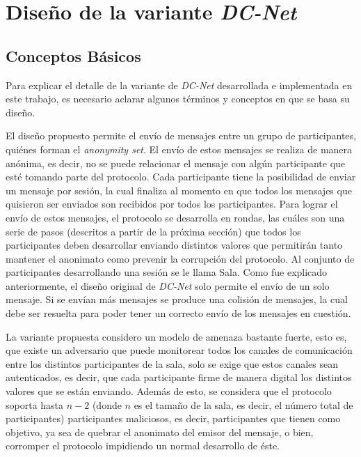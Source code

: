 \chapter{Diseño de la variante \emph{DC-Net}}\label{cap3}

\section{Conceptos Básicos}

Para explicar el detalle de la variante de \emph{DC-Net} desarrollada e implementada en este trabajo, es necesario aclarar algunos términos y conceptos en que se basa su diseño.

El diseño propuesto permite el envío de mensajes entre un grupo de participantes, quiénes forman el \emph{anonymity set}. El envío de estos mensajes se realiza de manera anónima, es decir, no se puede relacionar el mensaje con algún participante que esté tomando parte del protocolo. Cada participante tiene la posibilidad de enviar un mensaje por sesión, la cual finaliza al momento en que todos los mensajes que quisieron ser enviados son recibidos por todos los participantes. Para lograr el envío de estos mensajes, el protocolo se desarrolla en rondas, las cuáles son una serie de pasos 
(descritos a partir de la próxima sección) que todos los participantes deben desarrollar enviando distintos valores que permitirán tanto mantener el anonimato como prevenir la corrupción del protocolo. Al conjunto de participantes desarrollando una sesión se le llama Sala. Como fue explicado anteriormente, el diseño original de \emph{DC-Net} solo permite el envío de un solo mensaje. Si se envían más mensajes se produce una colisión de mensajes, la cual debe ser resuelta para poder tener un correcto envío de los mensajes en cuestión.

La variante propuesta considero un modelo de amenaza bastante fuerte, esto es, que existe un adversario que puede monitorear todos los canales de comunicación entre los distintos participantes de la sala, solo se exige que estos canales sean autenticados, es decir, que cada participante firme de manera digital los distintos valores que se están enviando. Además de esto, se considera que el protocolo soporta hasta $n-2$ (donde $n$ es el tamaño de la sala, es decir, el número total de participantes) participantes maliciosos, es decir, participantes que tienen como objetivo, ya sea de quebrar el anonimato del emisor del mensaje, o bien, corromper el protocolo impidiendo un normal desarrollo de éste.

